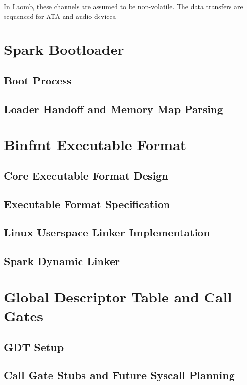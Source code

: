 \documentclass[12pt,a4paper]{report}
\begin{document}
	In Laomb, these channels are assumed to be non-volatile. The data transfers are sequenced for ATA and audio devices.
	
	\chapter{Spark Bootloader}
	\section{Boot Process}

	
	\section{Loader Handoff and Memory Map Parsing}

	
	\chapter{Binfmt Executable Format}
	\label{sec:binfmt}
	\section{Core Executable Format Design}

	\section{Executable Format Specification}
	
	\section{Linux Userspace Linker Implementation}

	\section{Spark Dynamic Linker}

	\chapter{Global Descriptor Table and Call Gates}
	\section{GDT Setup}
	
	\section{Call Gate Stubs and Future Syscall Planning}
\end{document}
